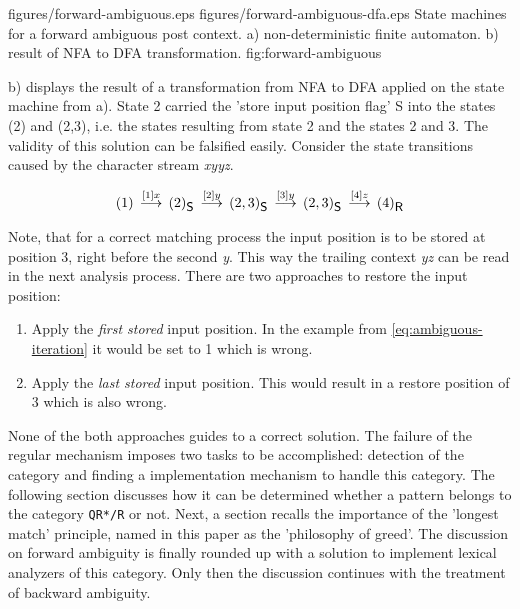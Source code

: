 \showdpic
{figures/forward-ambiguous.eps}
{figures/forward-ambiguous-dfa.eps}
{State machines for a forward ambiguous post context. a) non-deterministic finite automaton.
b) result of NFA to DFA transformation.}
{fig:forward-ambiguous}

b) displays the result of a transformation
from NFA to DFA applied on the state machine from
a).  State 2 carried the 'store input position
flag' {\sf S} into the states (2) and (2,3), i.e. the states resulting from
state 2 and the states 2 and 3. The validity of this solution can be falsified
easily. Consider the state transitions caused by the character stream
{\it xyyz}. 

\begin{eqnarray}
\label{eq:ambiguous-iteration}
(1)                  \, \stackrel{[1]x}{\longrightarrow} \,
(2)_{\mbox{\sf \small S}}   \, \stackrel{[2]y}{\longrightarrow} \,
(2,3)_{\mbox{\sf \small S}} \, \stackrel{[3]y}{\longrightarrow} \,
(2,3)_{\mbox{\sf \small S}} \, \stackrel{[4]z}{\longrightarrow} \,
(4)_{\mbox{\sf \small R}}
\end{eqnarray}


Note, that for a correct
matching process the input position is to be stored at position 3, right before the
second {\it y}. This way the trailing context {\it yz} can be read in the next
analysis process. There are two approaches to restore the input position:

\begin{enumerate}
\item Apply the {\it first stored} input position. In the example from 
      \eqref{eq:ambiguous-iteration} it would be set to 1 which 
      is wrong.

\item Apply the {\it last stored} input position. This would result in a 
      restore position of 3 which is also wrong.
\end{enumerate}

None of the both approaches guides to a correct solution. The failure of the
regular mechanism imposes two tasks to be accomplished: detection of the
category and finding a implementation mechanism to handle this category.  The
following section discusses how it can be determined whether a pattern belongs
to the category {\tt QR*/R} or not. Next, a section recalls the importance of
the 'longest match' principle, named in this paper as the 'philosophy of
greed'. The discussion on forward ambiguity is finally rounded up with a
solution to implement lexical analyzers of this category. Only then the
discussion continues with the treatment of backward ambiguity.



